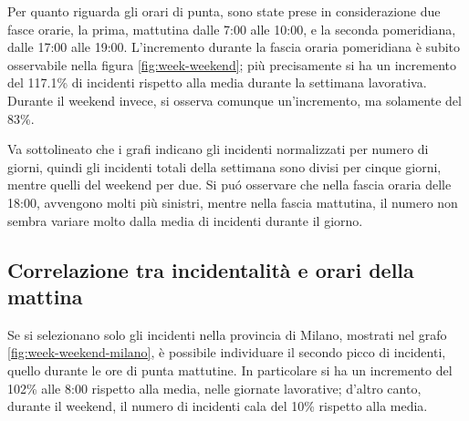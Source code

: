 \documentclass[a4paper]{report}
\begin{document}
Per quanto riguarda gli orari di punta, sono state prese in considerazione due fasce orarie, la prima, 
mattutina dalle 7:00 alle 10:00, e la seconda pomeridiana, dalle 17:00 alle 19:00.
L'incremento durante la fascia oraria pomeridiana è subito osservabile nella figura 
\ref{fig:week-weekend}; più precisamente si 
ha un incremento del 117.1\% di incidenti rispetto alla media durante la settimana lavorativa. 
Durante il weekend invece, si osserva comunque un'incremento, ma solamente del 83\%.


%

Va sottolineato che i grafi indicano gli incidenti normalizzati per numero di 
giorni, 
quindi gli incidenti totali della settimana sono divisi per cinque giorni, 
mentre quelli del weekend per due.
Si pu\'o osservare che nella fascia oraria delle 18:00, 
avvengono molti più sinistri, mentre nella fascia mattutina, 
il numero non sembra variare molto dalla media di incidenti durante il giorno.

\subsection{Correlazione tra incidentalità e orari della mattina}

Se si selezionano solo gli incidenti nella provincia di Milano, mostrati nel grafo 
\ref{fig:week-weekend-milano}, è possibile individuare 
il secondo picco di incidenti, quello durante le ore di punta mattutine.
In particolare si ha un incremento del 102\% alle 8:00 rispetto alla media, nelle giornate lavorative;
d'altro canto, durante il weekend, il numero di incidenti cala del 10\% rispetto alla media.

\end{document}
